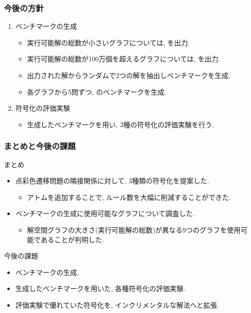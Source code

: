 \documentclass[dvipdfmx,11pt]{beamer}
\begin{document}
\begin{frame}\frametitle{今後の方針}

  \begin{enumerate}
    \item ベンチマークの生成 
    \begin{itemize}
      \item 実行可能解の総数が小さいグラフについては, を出力.
      \item 実行可能解の総数が100万個を超えるグラフについては, を出力.
      \item 出力された解からランダムで2つの解を抽出しベンチマークを生成.
      \item 各グラフから5問ずつ, のベンチマークを生成.
    \end{itemize}

    \item 符号化の評価実験
    \begin{itemize}
      \item 生成したベンチマークを用い, 3種の符号化の評価実験を行う.
    \end{itemize}
  \end{enumerate}
  

\end{frame}


\begin{frame}\frametitle{まとめと今後の課題}

  \begin{block}{まとめ}
    \begin{itemize}
      \item 点彩色遷移問題の隣接関係に対して, 3種類の符号化を提案した.
      \begin{itemize}
        \item アトムを追加することで, ルール数を大幅に削減することができた.
      \end{itemize}
      \item ベンチマークの生成に使用可能なグラフについて調査した.
      \begin{itemize}
        \item 解空間グラフの大きさ(実行可能解の総数)が異なる9つのグラフを使用可能であることが判明した.
      \end{itemize}
    \end{itemize}
  \end{block}
  
  \begin{alertblock}{今後の課題}
    \begin{itemize}
      \item ベンチマークの生成.
      \item 生成したベンチマークを用いた, 各種符号化の評価実験.
      \item 評価実験で優れていた符号化を, インクリメンタルな解法へと拡張.
    \end{itemize}
  \end{alertblock}

\end{frame}



\end{document}
